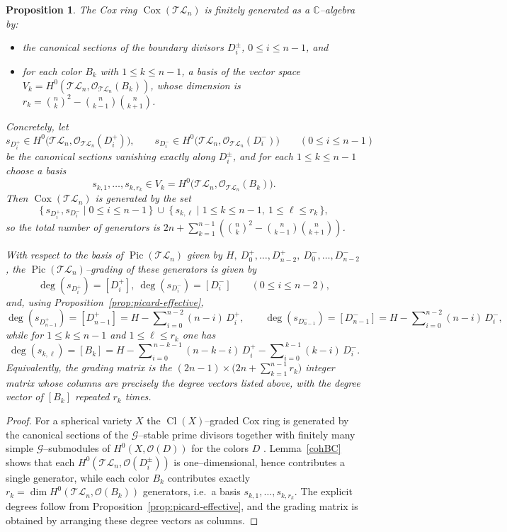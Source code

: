 \documentclass[10pt]{amsart}
\newtheorem{proposition}[theorem]{Proposition}
\theoremstyle{definition}
\newcommand{\C}{\mathbb{C}}
\newcommand{\OO}{\mathcal{O}}
\newcommand{\Pic}{\operatorname{Pic}}
\DeclareMathOperator{\Cox}{Cox}
\DeclareMathOperator{\Cl}{Cl}
\newcommand{\TL}{\mathcal{TL}}
\theoremstyle{plain} %
\begin{document}
\begin{proposition}\label{prop:Cox-TLn}
The Cox ring $\Cox(\TL_n)$ is finitely generated as a $\C$--algebra by:
\begin{itemize}
\item[-] the canonical sections of the boundary divisors $D_i^\pm$,
$0\le i\le n-1$, and
\item[-] for each color $B_k$ with $1\le k\le n-1$, a basis of the vector space
$V_k=H^0(\TL_n,\OO_{\TL_n}(B_k))$, whose dimension is
$r_k=\binom{n}{k}^2-\binom{n}{k-1}\binom{n}{k+1}$.
\end{itemize}

Concretely, let
\[
s_{D_i^+}\in H^0\bigl(\TL_n,\OO_{\TL_n}(D_i^+)\bigr),\qquad
s_{D_i^-}\in H^0\bigl(\TL_n,\OO_{\TL_n}(D_i^-)\bigr)
\qquad (0\le i\le n-1)
\]
be the canonical sections vanishing exactly along $D_i^\pm$, and for each
$1\le k\le n-1$ choose a basis
\[
s_{k,1},\dots,s_{k,r_k}\in V_k=H^0\bigl(\TL_n,\OO_{\TL_n}(B_k)\bigr).
\]
Then $\Cox(\TL_n)$ is generated by the set
\[
\{\,s_{D_i^+},s_{D_i^-}\mid 0\le i\le n-1\,\}
\ \cup\
\{\,s_{k,\ell}\mid 1\le k\le n-1,\ 1\le \ell\le r_k\,\},
\]
so the total number of generators is
$2n+\sum_{k=1}^{n-1}\left(\binom{n}{k}^2-\binom{n}{k-1}\binom{n}{k+1}\right)$.

With respect to the basis of $\Pic(\TL_n)$ given by
$H,\ D_0^+,\dots,D_{n-2}^+,\ D_0^-,\dots,D_{n-2}^-$,
the $\Pic(\TL_n)$--grading of these generators is given by
\[
\deg(s_{D_i^+})=[D_i^+],\ \deg(s_{D_i^-})=[D_i^-]\qquad (0\le i\le n-2),
\]
and, using Proposition~\ref{prop:picard-effective},
\[
\deg(s_{D_{n-1}^+})=[D_{n-1}^+]
=
H-\sum\nolimits_{i=0}^{n-2}(n-i)\,D_i^+,
\qquad
\deg(s_{D_{n-1}^-})=[D_{n-1}^-]
=
H-\sum\nolimits_{i=0}^{n-2}(n-i)\,D_i^-,
\]
while for $1\le k\le n-1$ and $1\le \ell\le r_k$ one has
\[
\deg(s_{k,\ell})=[B_k]
=
H
-\sum\nolimits_{i=0}^{\,n-k-1}(n-k-i)\,D_i^+
-\sum\nolimits_{i=0}^{\,k-1}(k-i)\,D_i^-.
\]
Equivalently, the grading matrix is the $(2n-1)\times\bigl(2n+\sum_{k=1}^{n-1}r_k\bigr)$
integer matrix whose columns are precisely the degree vectors listed above, with the
degree vector of $[B_k]$ repeated $r_k$ times.

\end{proposition}

\begin{proof}
For a spherical variety $X$ the $\Cl(X)$--graded Cox ring is generated by the canonical sections of the $\mathscr{G}$--stable prime divisors together with finitely many simple $\mathscr{G}$--submodules of $H^0(X,\OO(D))$ for the colors $D$ \cite[Theorem 4.5.4.6]{ADHL15}. Lemma~\ref{cohBC} shows that each $H^0(\TL_n,\OO(D_i^\pm))$ is one--dimensional, hence contributes a single generator, while each color $B_k$ contributes exactly $r_k=\dim H^0(\TL_n,\OO(B_k))$ generators, i.e.\ a basis $s_{k,1},\dots,s_{k,r_k}$. The explicit degrees follow from Proposition~\ref{prop:picard-effective}, and the grading matrix is obtained by arranging these degree vectors as columns.
\end{proof}
\end{document}
